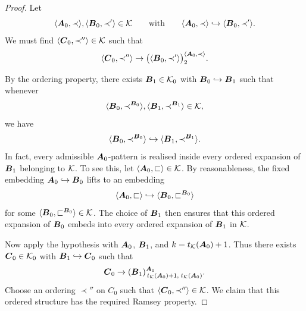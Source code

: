 \begin{proof}
    Let
    \[
        \langle\boldsymbol{A}_0,\prec\rangle,\langle\boldsymbol{B}_0,\prec'\rangle\in\mathcal{K}
        \qquad\text{with}\qquad
        \langle\boldsymbol{A}_0,\prec\rangle\hookrightarrow\langle\boldsymbol{B}_0,\prec'\rangle.
    \]
    We must find \(\langle\boldsymbol{C}_0,\prec''\rangle\in\mathcal{K}\) such that
    \[
        \langle\boldsymbol{C}_0,\prec''\rangle\to
        \bigl(\langle\boldsymbol{B}_0,\prec'\rangle\bigr)^{\langle\boldsymbol{A}_0,\prec\rangle}_{2}.
    \]

    By the ordering property, there exists \(\boldsymbol{B}_1\in\mathcal{K}_0\) with
    \(\boldsymbol{B}_0\hookrightarrow\boldsymbol{B}_1\) such that whenever
    \[
        \langle\boldsymbol{B}_0,\prec^{\boldsymbol{B}_0}\rangle,\langle\boldsymbol{B}_1,\prec^{\boldsymbol{B}_1}\rangle\in\mathcal{K},
    \]
    we have
    \[
        \langle\boldsymbol{B}_0,\prec^{\boldsymbol{B}_0}\rangle\hookrightarrow\langle\boldsymbol{B}_1,\prec^{\boldsymbol{B}_1}\rangle.
    \]
    In fact, every admissible \(\boldsymbol{A}_0\)-pattern is realised inside every
    ordered expansion of \(\boldsymbol{B}_1\) belonging to \(\mathcal{K}\). To see this, let
    \(\langle\boldsymbol{A}_0,\sqsubset\rangle\in\mathcal{K}\). By reasonableness, the fixed
    embedding \(\boldsymbol{A}_0\hookrightarrow\boldsymbol{B}_0\) lifts to an embedding
    \[
        \langle\boldsymbol{A}_0,\sqsubset\rangle
        \hookrightarrow
        \langle\boldsymbol{B}_0,\sqsubset^{\boldsymbol{B}_0}\rangle
    \]
    for some \(\langle\boldsymbol{B}_0,\sqsubset^{\boldsymbol{B}_0}\rangle\in\mathcal{K}\). The choice of
    \(\boldsymbol{B}_1\) then ensures that this ordered expansion of \(\boldsymbol{B}_0\) embeds
    into every ordered expansion of \(\boldsymbol{B}_1\) in \(\mathcal{K}\).

    Now apply the hypothesis with \(\boldsymbol{A}_0\), \(\boldsymbol{B}_1\), and \(k=t_{\mathcal{K}}(\boldsymbol{A}_0)+1\).
    Thus there exists \(\boldsymbol{C}_0\in\mathcal{K}_0\) with
    \(\boldsymbol{B}_1\hookrightarrow\boldsymbol{C}_0\) such that
    \[
        \boldsymbol{C}_0\to(\boldsymbol{B}_1)^{\boldsymbol{A}_0}_{\,t_{\mathcal{K}}(\boldsymbol{A}_0)+1,\;t_{\mathcal{K}}(\boldsymbol{A}_0)}.
    \]
    Choose an ordering \(\prec''\) on \(C_0\) such that \(\langle\boldsymbol{C}_0,\prec''\rangle\in\mathcal{K}\).
    We claim that this ordered structure has the required Ramsey property.


\end{proof}
